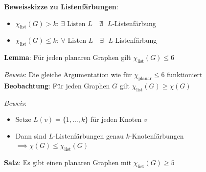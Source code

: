 \bigskip
\textbf{Beweisskizze zu Listenfärbungen}: 
\begin{itemize}
	\item $\chi_{\text{list}}(G)>k$: $\exists \text{ Listen } L\quad \nexists\text{ } L$-Listenfärbung 
	\item $\chi_{\text{list}}(G)\leq k$: $\forall \text{ Listen } L\quad \exists\text{ } L$-Listenfärbung
\end{itemize}
\bigskip
\textbf{Lemma}: Für jeden planaren Graphen gilt $\chi_{\text{list}}(G)\leq 6$

\textit{Beweis}: Die gleiche Argumentation wie für $\chi_{\text{planar}}\leq 6$ funktioniert\\

\textbf{Beobachtung}: Für jeden Graphen $G$ gilt $\chi_{\text{list}}(G)\geq \chi(G)$

\textit{Beweis}: 
\begin{itemize}
	\item Setze $L(v)=\{1,\ldots,k\}$ für jeden Knoten $v$
	\item Dann sind $L$-Listenfärbungen genau $k$-Knotenfärbungen $\implies \chi(G)\leq \chi_{\text{list}}(G)$
\end{itemize}
\bigskip
\textbf{Satz}: Es gibt einen planaren Graphen mit $\chi_{\text{list}}(G)\geq 5$

